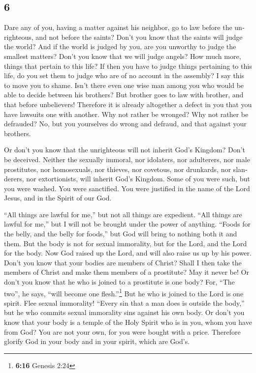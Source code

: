 \begin{paracol}{2}
\switchcolumn
\begin{otherlanguage}{english}

\hypertarget{section-11}{%
\section{6}\label{section-11}}

 Dare any of you, having a matter against his neighbor, go
to law before the unrighteous, and not before the saints? 
Don't you know that the saints will judge the world? And if the world is
judged by you, are you unworthy to judge the smallest matters?
 Don't you know that we will judge angels? How much more,
things that pertain to this life?  If then you have to
judge things pertaining to this life, do you set them to judge who are
of no account in the assembly?  I say this to move you to
shame. Isn't there even one wise man among you who would be able to
decide between his brothers?  But brother goes to law with
brother, and that before unbelievers!  Therefore it is
already altogether a defect in you that you have lawsuits one with
another. Why not rather be wronged? Why not rather be defrauded?
 No, but you yourselves do wrong and defraud, and that
against your brothers.

 Or don't you know that the unrighteous will not inherit
God's Kingdom? Don't be deceived. Neither the sexually immoral, nor
idolaters, nor adulterers, nor male prostitutes, nor homosexuals,
 nor thieves, nor covetous, nor drunkards, nor
slanderers, nor extortionists, will inherit God's Kingdom.
 Some of you were such, but you were washed. You were
sanctified. You were justified in the name of the Lord Jesus, and in the
Spirit of our God.

 ``All things are lawful for me,'' but not all things are
expedient. ``All things are lawful for me,'' but I will not be brought
under the power of anything.  ``Foods for the belly, and
the belly for foods,'' but God will bring to nothing both it and them.
But the body is not for sexual immorality, but for the Lord, and the
Lord for the body.  Now God raised up the Lord, and will
also raise us up by his power.  Don't you know that your
bodies are members of Christ? Shall I then take the members of Christ
and make them members of a prostitute? May it never be! 
Or don't you know that he who is joined to a prostitute is one body?
For, ``The two'', he says, ``will become one flesh.''\footnote{\textbf{6:16}
  Genesis 2:24}  But he who is joined to the Lord is one
spirit.  Flee sexual immorality! ``Every sin that a man
does is outside the body,'' but he who commits sexual immorality sins
against his own body.  Or don't you know that your body
is a temple of the Holy Spirit who is in you, whom you have from God?
You are not your own,  for you were bought with a price.
Therefore glorify God in your body and in your spirit, which are God's.


\end{otherlanguage}
\end{paracol}
